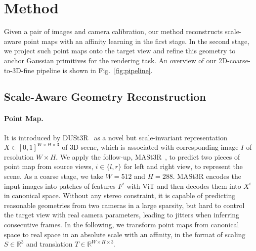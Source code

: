\section{Method}
\label{sec:method}

Given a pair of images and camera calibration, our method reconstructs scale-aware point maps with an affinity learning in the first stage.
In the second stage, we project such point maps onto the target view and refine this geometry to anchor Gaussian primitives for the rendering task. 
An overview of our 2D-coarse-to-3D-fine pipeline is shown in Fig.~\ref{fig:pipeline}. 

\subsection{Scale-Aware Geometry Reconstruction}
\label{sec:geometry}
\paragraph{Point Map.} It is introduced by DUSt3R~\cite{wang2024dust3r} as a novel but scale-invariant representation $X \in [0, 1]^{W \times H \times 3}$ of 3D scene, which is associated with corresponding image $I$ of resolution $W \times H$. 
We apply the follow-up, MASt3R~\cite{leroy2024grounding}, to predict two pieces of point map from source views, $i \in \{l, r\}$ for left and right view, to represent the scene.
As a coarse stage, we take $W = 512$ and $H=288$.
MASt3R encodes the input images into patches of features $F^{i}$ with ViT and then decodes them into $X^i$ in canonical space.
Without any stereo constraint, it is capable of predicting reasonable geometries from two cameras in a large sparsity, but hard to control the target view with real camera parameters, leading to jitters when inferring consecutive frames.
%
In the following, we transform point maps from canonical space to real space in an absolute scale with an affinity, in the format of scaling $S \in \mathbb{R}^3$ and translation $T \in \mathbb{R}^{W \times H \times 3}$.

